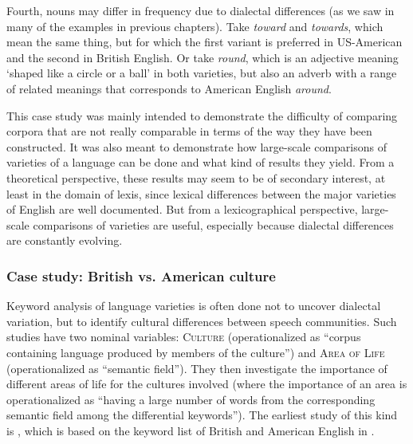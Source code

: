 Fourth, nouns  may differ in frequency  due to dialectal differences (as we saw in many of the examples in previous chapters). Take \textit{toward} and \textit{towards}, which mean the same thing, but for which the first variant is preferred in US\hyp{}American  and the second in British  English. Or take \textit{round}, which is an adjective  meaning `shaped like a circle or a ball' in both varieties,  but also an adverb  with a range of related meanings that corresponds to American English \textit{around}.

This case study was mainly intended to demonstrate the difficulty of comparing corpora that are not really comparable in terms of the way they have been constructed. It was also meant to demonstrate how large\hyp{}scale comparisons of varieties  of a language can be done and what kind of results they yield. From a theoretical perspective, these results may seem to be of secondary interest, at least in the domain of lexis, since lexical differences between the major varieties of English are well documented. But from a lexicographical perspective, large\hyp{}scale comparisons of varieties  are useful, especially because dialectal differences are constantly evolving.

\subsubsection{Case study: British vs. American culture}\label{sec:britishvsamericanculture}\largerpage

Keyword  analysis of language varieties  is often done not to uncover dialectal variation,  but to identify cultural  differences between speech communities. Such studies have two nominal  variables: \textsc{Culture} (operationalized  as ``corpus containing language produced by members of the culture'') and \textsc{Area of Life} (operationalized as ``semantic field''). They then investigate the importance of different areas of life for the cultures  involved (where the importance of an area is operationalized  as ``having a large number of words from the corresponding semantic  field among the differential keywords'').  The earliest study of this kind is \citet{leech_computer_1992}, which is based on the keyword list of British  and American  English in \citet{johansson_frequency_1989}.

